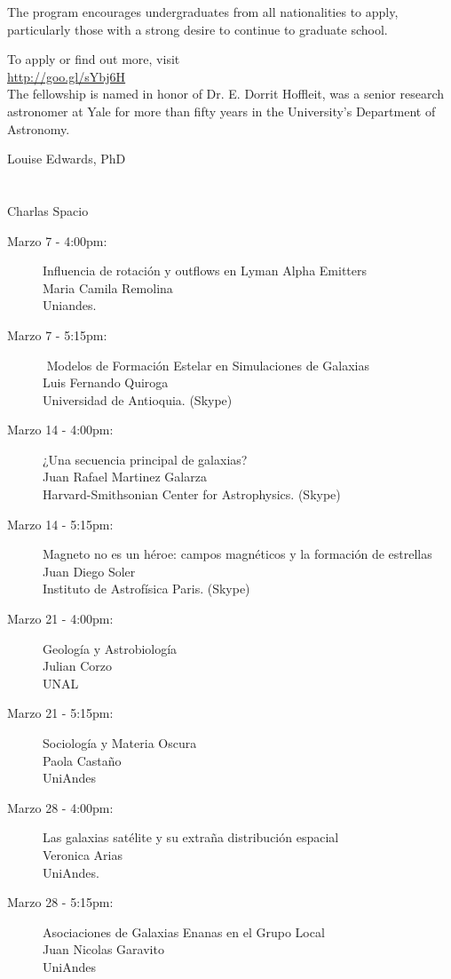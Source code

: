 \documentclass{book}
\begin{document}
The program encourages undergraduates from all nationalities to apply, particularly those with a strong desire to continue to graduate school.


To apply or find out more, visit\\ \url{http://goo.gl/sYbj6H}\\

The fellowship is named in honor of Dr. E. Dorrit Hoffleit, was a senior research astronomer at Yale for more than fifty years in the University’s Department of Astronomy.

Louise Edwards, PhD

\section*{}

Charlas Spacio

\begin{description}
\item[Marzo 7 - 4:00pm:] ​Influencia de rotación y outflows en Lyman Alpha Emitters\\
 ​Maria Camila Remolina\\
 Uniandes.
\item[Marzo 7 - 5:15pm:]​ Modelos de Formación Estelar en Simulaciones de Galaxias\\
Luis Fernando Quiroga\\
 Universidad de Antioquia.​ (Skype)
\item[Marzo 14 - 4:00pm:]  ¿​Una secuencia principal de galaxias?\\ 
Juan Rafael Martinez Galarza\\ 
Harvard-Smithsonian Center for Astrophysics. ​(Skype)
\item[Marzo 14 - 5:15pm:] Magneto no es un héroe: campos magnéticos y la formación de estrellas\\ 
 ​Juan Diego Soler\\
 Instituto de Astrofísica Paris. ​(Skype)  
\item[Marzo 21 - 4:00pm:] ​Geología y Astrobiología​\\ 
Julian Corzo\\  
UNAL
\item[Marzo 21 - 5:15pm:] ​S​ociología y Materia Oscura\\
​Paola Castaño\\ 
UniAndes  
\item[Marzo 28 - 4:00pm:]  ​Las galaxias satélite y su extraña distribución espacial\\
Veronica Arias\\
UniAndes.
\item[Marzo 28 - 5:15pm:]  ​Asociaciones de Galaxias Enanas en el Grupo Local\\
​Juan Nicolas Garavito\\
UniAndes 
\end{description}
\end{document}
